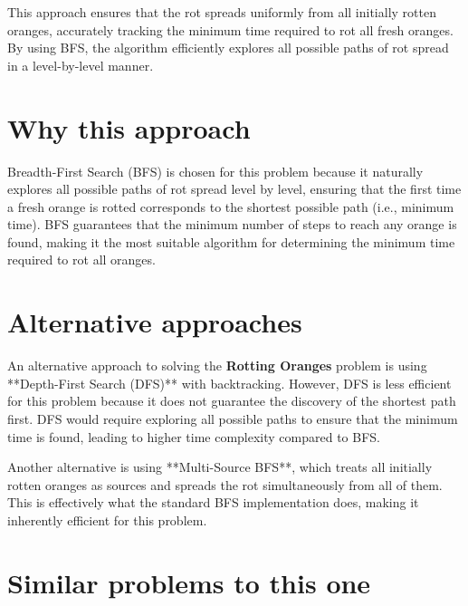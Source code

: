 This approach ensures that the rot spreads uniformly from all initially rotten oranges, accurately tracking the minimum time required to rot all fresh oranges. By using BFS, the algorithm efficiently explores all possible paths of rot spread in a level-by-level manner.

\section*{Why this approach}

Breadth-First Search (BFS) is chosen for this problem because it naturally explores all possible paths of rot spread level by level, ensuring that the first time a fresh orange is rotted corresponds to the shortest possible path (i.e., minimum time). BFS guarantees that the minimum number of steps to reach any orange is found, making it the most suitable algorithm for determining the minimum time required to rot all oranges.

\section*{Alternative approaches}

An alternative approach to solving the \textbf{Rotting Oranges} problem is using **Depth-First Search (DFS)** with backtracking. However, DFS is less efficient for this problem because it does not guarantee the discovery of the shortest path first. DFS would require exploring all possible paths to ensure that the minimum time is found, leading to higher time complexity compared to BFS.

Another alternative is using **Multi-Source BFS**, which treats all initially rotten oranges as sources and spreads the rot simultaneously from all of them. This is effectively what the standard BFS implementation does, making it inherently efficient for this problem.

\section*{Similar problems to this one}

